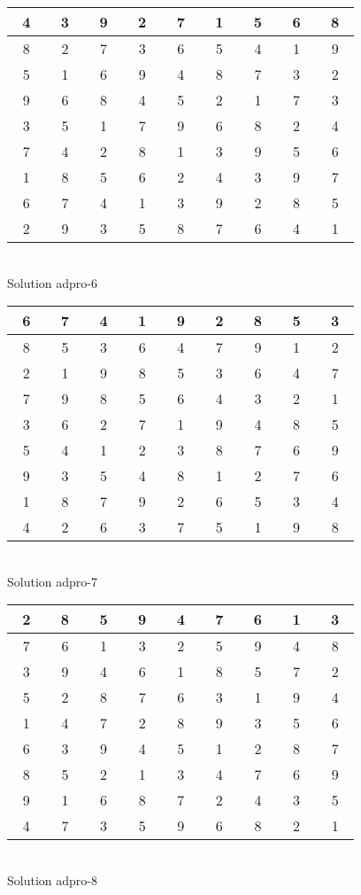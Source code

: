 \documentclass[12pt,a4paper]{article}
\begin{document}
\begin{center}
\begin{tabular}{||c|c|c||c|c|c||c|c|c||}\hline\hline
~4~&~3~&~9~&~2~&~7~&~1~&~5~&~6~&~8~\\\hline
~8~&~2~&~7~&~3~&~6~&~5~&~4~&~1~&~9~\\\hline
~5~&~1~&~6~&~9~&~4~&~8~&~7~&~3~&~2~\\\hline
\hline
~9~&~6~&~8~&~4~&~5~&~2~&~1~&~7~&~3~\\\hline
~3~&~5~&~1~&~7~&~9~&~6~&~8~&~2~&~4~\\\hline
~7~&~4~&~2~&~8~&~1~&~3~&~9~&~5~&~6~\\\hline
\hline
~1~&~8~&~5~&~6~&~2~&~4~&~3~&~9~&~7~\\\hline
~6~&~7~&~4~&~1~&~3~&~9~&~2~&~8~&~5~\\\hline
~2~&~9~&~3~&~5~&~8~&~7~&~6~&~4~&~1~\\\hline
\hline\end{tabular}\\[1.5ex]
Solution adpro-6
\end{center}
\begin{center}
\begin{tabular}{||c|c|c||c|c|c||c|c|c||}\hline\hline
~6~&~7~&~4~&~1~&~9~&~2~&~8~&~5~&~3~\\\hline
~8~&~5~&~3~&~6~&~4~&~7~&~9~&~1~&~2~\\\hline
~2~&~1~&~9~&~8~&~5~&~3~&~6~&~4~&~7~\\\hline
\hline
~7~&~9~&~8~&~5~&~6~&~4~&~3~&~2~&~1~\\\hline
~3~&~6~&~2~&~7~&~1~&~9~&~4~&~8~&~5~\\\hline
~5~&~4~&~1~&~2~&~3~&~8~&~7~&~6~&~9~\\\hline
\hline
~9~&~3~&~5~&~4~&~8~&~1~&~2~&~7~&~6~\\\hline
~1~&~8~&~7~&~9~&~2~&~6~&~5~&~3~&~4~\\\hline
~4~&~2~&~6~&~3~&~7~&~5~&~1~&~9~&~8~\\\hline
\hline\end{tabular}\\[1.5ex]
Solution adpro-7
\end{center}
\begin{center}
\begin{tabular}{||c|c|c||c|c|c||c|c|c||}\hline\hline
~2~&~8~&~5~&~9~&~4~&~7~&~6~&~1~&~3~\\\hline
~7~&~6~&~1~&~3~&~2~&~5~&~9~&~4~&~8~\\\hline
~3~&~9~&~4~&~6~&~1~&~8~&~5~&~7~&~2~\\\hline
\hline
~5~&~2~&~8~&~7~&~6~&~3~&~1~&~9~&~4~\\\hline
~1~&~4~&~7~&~2~&~8~&~9~&~3~&~5~&~6~\\\hline
~6~&~3~&~9~&~4~&~5~&~1~&~2~&~8~&~7~\\\hline
\hline
~8~&~5~&~2~&~1~&~3~&~4~&~7~&~6~&~9~\\\hline
~9~&~1~&~6~&~8~&~7~&~2~&~4~&~3~&~5~\\\hline
~4~&~7~&~3~&~5~&~9~&~6~&~8~&~2~&~1~\\\hline
\hline\end{tabular}\\[1.5ex]
Solution adpro-8
\end{center}
\end{document}
